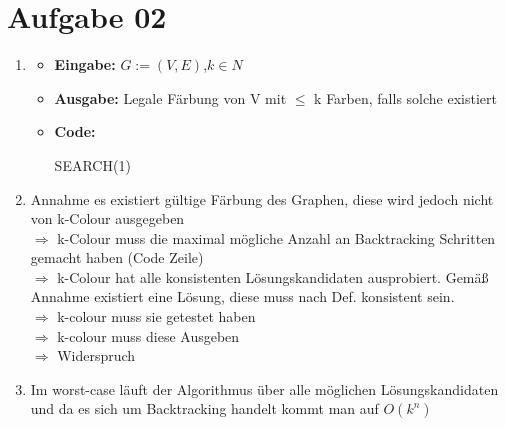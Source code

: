 \documentclass[10pt,a4paper]{article}
\begin{document}
\section*{Aufgabe 02}
    \begin{enumerate}[label={\alph*)}]

        \item
            \begin{itemize}
                \item \textbf{Eingabe:} $G:=(V,E)$,$ k \in N$
                \item \textbf{Ausgabe:}
                    Legale Färbung von V mit $\leq$ k Farben, falls solche existiert
                \item \textbf{Code: } \\
                \begin{algorithm}[H]
                    SEARCH(1) \;
                     {
                    }
                \end{algorithm}

            \end{itemize}


        \item
                Annahme es existiert gültige Färbung des Graphen, diese wird jedoch nicht von k-Colour ausgegeben
                    \\$\Rightarrow$ k-Colour muss die maximal mögliche Anzahl an Backtracking Schritten gemacht haben (Code Zeile)
                    \\$\Rightarrow$ k-Colour hat alle konsistenten Lösungskandidaten ausprobiert.
                    Gemäß Annahme existiert eine Lösung, diese muss nach Def. konsistent sein.
                    \\$\Rightarrow$ k-colour muss sie getestet haben
                    \\$\Rightarrow$ k-colour muss diese Ausgeben
                    \\$\Rightarrow$ Widerspruch

        \item Im worst-case läuft der Algorithmus über alle möglichen
                    Lösungskandidaten und da es sich um Backtracking handelt
                    kommt man auf $O(k^n)$

    \end{enumerate}
\end{document}
